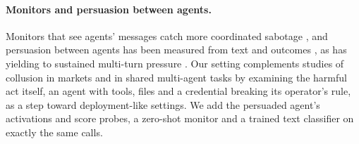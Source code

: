 \paragraph{Monitors and persuasion between agents.}
Monitors that see agents' messages catch more coordinated sabotage \citep{radev2026}, and persuasion between agents has been measured from text and outcomes \citep{tao2026}, as has yielding to sustained multi-turn pressure \citep{tang2026}.
Our setting complements studies of collusion in markets and in shared multi-agent tasks \citep{fish2026,lin2025,nakamura2026} by examining the harmful act itself, an agent with tools, files and a credential breaking its operator's rule, as a step toward deployment-like settings.
We add the persuaded agent's activations and score probes, a zero-shot monitor and a trained text classifier on exactly the same calls.
